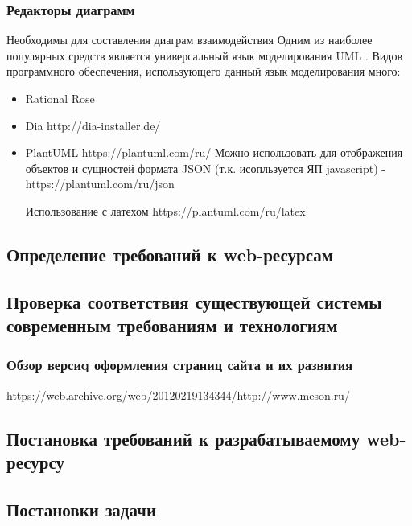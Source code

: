     \subsubsection{Редакторы диаграмм}
        Необходимы для составления диаграм взаимодействия
        Одним из наиболее популярных средств является универсальный язык моделирования UML \cite{wiki-UML}.
        Видов программного обеспечения, использующего данный язык моделирования много:
        \begin{itemize}
            \item Rational Rose
            \item Dia   http://dia-installer.de/
            \item PlantUML  https://plantuml.com/ru/
            Можно использовать для отображения объектов и сущностей формата JSON (т.к. исопльзуется ЯП javascript) - https://plantuml.com/ru/json

            Использование с латехом
            https://plantuml.com/ru/latex

        \end{itemize}

\subsection{Определение требований к web-ресурсам}
    
\subsection{Проверка соответствия существующей системы современным требованиям и технологиям}
    \subsubsection{Обзор версиq оформления страниц сайта и их развития}
        https://web.archive.org/web/20120219134344/http://www.meson.ru/

\subsection{Постановка требований к разрабатываемому web-ресурсу}

\subsection{Постановки задачи}

\clearpage

